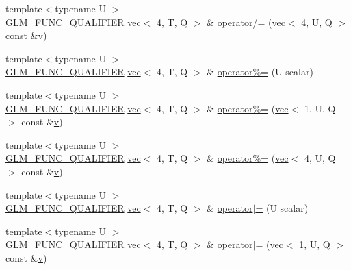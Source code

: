 \begin{DoxyCompactItemize}
\item 
{\footnotesize template$<$typename U $>$ }\\\hyperlink{setup_8hpp_a33fdea6f91c5f834105f7415e2a64407}{G\+L\+M\+\_\+\+F\+U\+N\+C\+\_\+\+Q\+U\+A\+L\+I\+F\+I\+ER} \hyperlink{structglm_1_1vec}{vec}$<$ 4, T, Q $>$ \& \hyperlink{structglm_1_1vec_3_014_00_01_t_00_01_q_01_4_aa9830c51f8b9bfc55e3d670007358be0}{operator/=} (\hyperlink{structglm_1_1vec}{vec}$<$ 4, U, Q $>$ const \&\hyperlink{_s_d_l__opengl_8h_a10a82eabcb59d2fcd74acee063775f90}{v})
\item 
{\footnotesize template$<$typename U $>$ }\\\hyperlink{setup_8hpp_a33fdea6f91c5f834105f7415e2a64407}{G\+L\+M\+\_\+\+F\+U\+N\+C\+\_\+\+Q\+U\+A\+L\+I\+F\+I\+ER} \hyperlink{structglm_1_1vec}{vec}$<$ 4, T, Q $>$ \& \hyperlink{structglm_1_1vec_3_014_00_01_t_00_01_q_01_4_ab18a2c7d078b35f9b8043ec429805577}{operator\%=} (U scalar)
\item 
{\footnotesize template$<$typename U $>$ }\\\hyperlink{setup_8hpp_a33fdea6f91c5f834105f7415e2a64407}{G\+L\+M\+\_\+\+F\+U\+N\+C\+\_\+\+Q\+U\+A\+L\+I\+F\+I\+ER} \hyperlink{structglm_1_1vec}{vec}$<$ 4, T, Q $>$ \& \hyperlink{structglm_1_1vec_3_014_00_01_t_00_01_q_01_4_a14fc67ccd918340ef8c1c1f584e8a4bb}{operator\%=} (\hyperlink{structglm_1_1vec}{vec}$<$ 1, U, Q $>$ const \&\hyperlink{_s_d_l__opengl_8h_a10a82eabcb59d2fcd74acee063775f90}{v})
\item 
{\footnotesize template$<$typename U $>$ }\\\hyperlink{setup_8hpp_a33fdea6f91c5f834105f7415e2a64407}{G\+L\+M\+\_\+\+F\+U\+N\+C\+\_\+\+Q\+U\+A\+L\+I\+F\+I\+ER} \hyperlink{structglm_1_1vec}{vec}$<$ 4, T, Q $>$ \& \hyperlink{structglm_1_1vec_3_014_00_01_t_00_01_q_01_4_a6f41e8cbca8438ff8a864f913f2801b2}{operator\%=} (\hyperlink{structglm_1_1vec}{vec}$<$ 4, U, Q $>$ const \&\hyperlink{_s_d_l__opengl_8h_a10a82eabcb59d2fcd74acee063775f90}{v})
\item 
{\footnotesize template$<$typename U $>$ }\\\hyperlink{setup_8hpp_a33fdea6f91c5f834105f7415e2a64407}{G\+L\+M\+\_\+\+F\+U\+N\+C\+\_\+\+Q\+U\+A\+L\+I\+F\+I\+ER} \hyperlink{structglm_1_1vec}{vec}$<$ 4, T, Q $>$ \& \hyperlink{structglm_1_1vec_3_014_00_01_t_00_01_q_01_4_abe08fcb3638c6605f6b404ca5c4621d5}{operator$\vert$=} (U scalar)
\item 
{\footnotesize template$<$typename U $>$ }\\\hyperlink{setup_8hpp_a33fdea6f91c5f834105f7415e2a64407}{G\+L\+M\+\_\+\+F\+U\+N\+C\+\_\+\+Q\+U\+A\+L\+I\+F\+I\+ER} \hyperlink{structglm_1_1vec}{vec}$<$ 4, T, Q $>$ \& \hyperlink{structglm_1_1vec_3_014_00_01_t_00_01_q_01_4_a3d9704513aa8df8d05bc30d20dd6bc71}{operator$\vert$=} (\hyperlink{structglm_1_1vec}{vec}$<$ 1, U, Q $>$ const \&\hyperlink{_s_d_l__opengl_8h_a10a82eabcb59d2fcd74acee063775f90}{v})

\end{DoxyCompactItemize}
